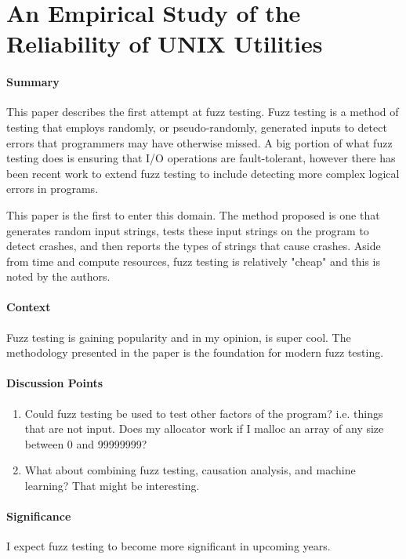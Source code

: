 \section {An Empirical Study of the Reliability of UNIX Utilities \cite{miller1990empirical}}

\paragraph{\textbf{Summary}}
This paper describes the first attempt at fuzz testing. Fuzz testing is a method
of testing that employs randomly, or pseudo-randomly, generated inputs to detect
errors that programmers may have otherwise missed. A big portion of what fuzz
testing does is ensuring that I/O operations are fault-tolerant, however there
has been recent work to extend fuzz testing to include detecting more complex
logical errors in programs.

This paper is the first to enter this domain. The method proposed is one that
generates random input strings, tests these input strings on the program to
detect crashes, and then reports the types of strings that cause crashes. Aside
from time and compute resources, fuzz testing is relatively "cheap" and this is
noted by the authors.

\paragraph{\textbf{Context}}
Fuzz testing is gaining popularity and in my opinion, is super cool. The
methodology presented in the paper is the foundation for modern fuzz testing.

\paragraph{\textbf{Discussion Points}}
\begin{enumerate}
    \item Could fuzz testing be used to test other factors of the program? i.e.
    things that are not input. Does my allocator work if I malloc an array of
    any size between 0 and 99999999?
    \item What about combining fuzz testing, causation analysis, and machine
    learning? That might be interesting.
\end{enumerate}

\paragraph{\textbf{Significance}}
I expect fuzz testing to become more significant in upcoming years.

